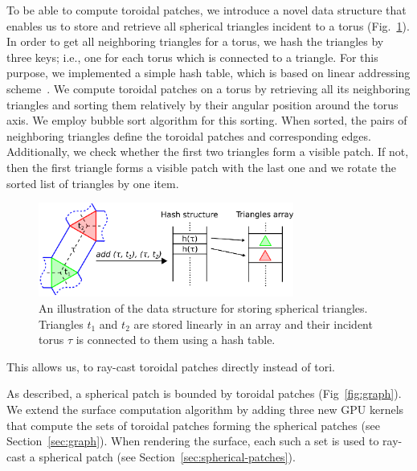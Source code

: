 To be able to compute toroidal patches, we introduce a novel data structure that enables us to store and retrieve all spherical triangles incident to a torus (Fig.~\ref{fig:hashing41}). In order to get all neighboring triangles for a torus, we hash the triangles by three keys; i.e., one for each torus which is connected to a triangle.
For this purpose, we implemented a simple hash table, which is based on linear addressing scheme~\cite{alcantara2011efficient}.
We compute toroidal patches on a torus by retrieving all its neighboring triangles and sorting them relatively by their angular position around the torus axis. We employ bubble sort algorithm for this sorting.
When sorted, the pairs of neighboring triangles define the toroidal patches and corresponding edges.
Additionally, we check whether the first two triangles form a visible patch.
If not, then the first triangle forms a visible patch with the last one and we rotate the sorted list of triangles by one item.
\begin{figure}[htb]
  \centering
  \includegraphics[width=3.3in]{image/hashing.png}
  \caption{An illustration of the data structure for storing spherical triangles. Triangles $t_1$ and $t_2$ are stored linearly in an array and their incident torus $\tau$ is connected to them using a hash table.}
	\label{fig:hashing41}
\end{figure}
This allows us, to ray-cast toroidal patches directly instead of tori.

As described, a spherical patch is bounded by toroidal patches (Fig~\ref{fig:graph}). We extend the surface computation algorithm by adding three new GPU kernels that compute the sets of toroidal patches forming the spherical patches (see Section~\ref{sec:graph}).
When rendering the surface, each such a set is used to ray-cast a spherical patch (see Section~\ref{sec:spherical-patches}).


